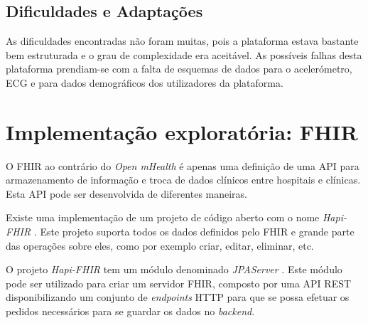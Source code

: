 \subsection{Dificuldades e Adaptações}

As dificuldades encontradas não foram muitas, pois a plataforma estava bastante bem estruturada e o grau de complexidade era aceitável. As possíveis falhas desta plataforma prendiam-se com a falta de esquemas de dados para o acelerómetro, \gls{ECG} e para dados demográficos dos utilizadores da plataforma.

\section{Implementação exploratória: FHIR}
O \gls{FHIR} ao contrário do \textit{Open mHealth} é apenas uma definição de uma \gls{API} para armazenamento de informação e troca de dados clínicos entre hospitais e clínicas. Esta \gls{API} pode ser desenvolvida de diferentes maneiras. \par 
Existe uma implementação de um projeto de código aberto com o nome \textit{Hapi-FHIR} \cite{hapi-index}. Este projeto suporta todos os dados definidos pelo \gls{FHIR} e grande parte das operações sobre eles, como por exemplo criar, editar, eliminar, etc.
\par 
O projeto \textit{Hapi-FHIR} tem um módulo denominado \textit{JPAServer}  \cite{jpa-server}. Este módulo pode ser utilizado para criar um servidor \gls{FHIR}, composto por uma \gls{API} \gls{REST} disponibilizando um conjunto de \textit{endpoints} \gls{HTTP} para que se possa efetuar os pedidos necessários para se guardar os dados no \textit{backend}. \par

